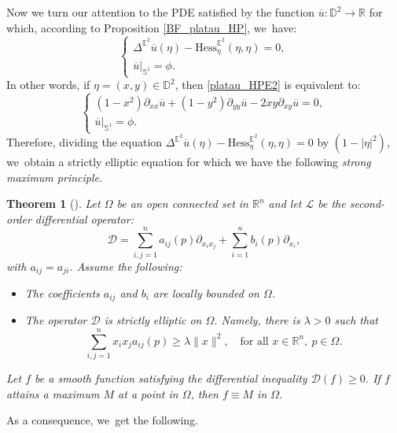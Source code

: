 \documentclass[JEP,XML,SOM,Unicode,NoEqCountersInSection, NoFloatCountersInSection,published]{cedram}
\theoremstyle{plain}
\newtheorem{theorem}[cor]{Theorem}
\theoremstyle{definition}
\begin{document}
Now we turn our attention to the PDE satisfied by the function $\overline{u}:\mathbb{D}^2 \to \mathbb{R}$ for which, according to Proposition \ref{BF_platau_HP}, we~have:
\begin{equation}
\begin{cases}\label{platau_HPE2}
\Delta^{\mathbb{E}^2}\overline{u}(\eta) - \mathrm{Hess}_{\eta}^{\mathbb{E}^2}(\eta,\eta) = 0, \\
\overline{u}|_{\mathbb{S}^1} = \phi.
\end{cases}
\end{equation}
In other words, if $\eta = (x,y) \in \mathbb{D}^2$, then \eqref{platau_HPE2} is equivalent to:
\begin{equation}
\begin{cases}
(1-x^2)\partial_{xx}\overline{u} + (1-y^2)\partial_{yy}\overline{u} - 2xy\partial_{xy}\overline{u} = 0, \\
\overline{u}|_{\mathbb{S}^1} = \phi.
\end{cases}
\end{equation}
Therefore, dividing the equation $\Delta^{\mathbb{E}^2}\overline{u}(\eta) - \mathrm{Hess}_{\eta}^{\mathbb{E}^2}(\eta,\eta) = 0$ by $(1-\lvert\eta\rvert^2)$, we~obtain a strictly elliptic equation for which we have the following \emph{strong maximum principle}.

\begin{theorem}[{\cite[\S 3]{Protter1967MaximumPI}}]\label{Strong_Max_P}
Let $\Omega$ be an open connected set in $\mathbb{R}^n$ and let $\mathcal{L}$ be the second-order differential operator:
\[
\mathcal{D} = \sum_{i,j=1}^{n}a_{ij}(p)\partial_{x_ix_j} + \sum_{i=1}^nb_i(p)\partial_{x_i},
\]
with $a_{ij} = a_{ji}$. Assume the following:
\begin{itemize}
\item The coefficients $a_{ij}$ and $b_i$ are locally bounded on $\Omega$.
\item The operator $\mathcal{D}$ is \emph{strictly elliptic} on $\Omega$. Namely, there is $\lambda > 0$ such that
\[
\sum_{i,j=1}^{n} x_i x_j a_{ij}(p) \geq \lambda \lVert x \rVert^2, \quad \text{for all } x \in \mathbb{R}^n, \ p \in \Omega.
\]
\end{itemize}
Let $f$ be a smooth function satisfying the differential inequality $\mathcal{D}(f) \geq 0$. If $f$ attains a maximum $M$ at a point in $\Omega$, then $f \equiv M$ in $\Omega$.
\end{theorem}

As a consequence, we~get the following.
\end{document}
